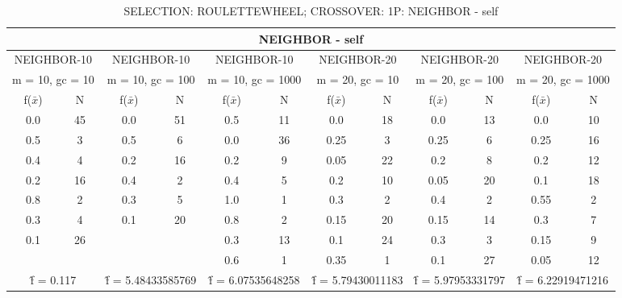 \begin{table}[H]
	\centering
	\caption{SELECTION: ROULETTEWHEEL; CROSSOVER: 1P: NEIGHBOR - self}
	\begin{adjustbox}{width=1\textwidth}
		\begin{tabular}{ |c|c||c|c||c|c||c|c||c|c||c|c| }
			\hline
			\multicolumn{12}{|c|}{NEIGHBOR - self} \\
			\hline
			\multicolumn{2}{|c||}{NEIGHBOR-10} & \multicolumn{2}{c||}{NEIGHBOR-10} & \multicolumn{2}{c||}{NEIGHBOR-10} & \multicolumn{2}{c||}{NEIGHBOR-20} & \multicolumn{2}{c||}{NEIGHBOR-20} & \multicolumn{2}{c|}{NEIGHBOR-20}\\
			\hline
			\multicolumn{2}{|c||}{m = 10, gc = 10} & \multicolumn{2}{c||}{m = 10, gc = 100} & \multicolumn{2}{c||}{m = 10, gc = 1000} & \multicolumn{2}{c||}{m = 20, gc = 10} & \multicolumn{2}{c||}{m = 20, gc = 100} & \multicolumn{2}{c|}{m = 20, gc = 1000}\\
			\hline
			f($\bar{x}$) & N & f($\bar{x}$) & N & f($\bar{x}$) & N & f($\bar{x}$) & N & f($\bar{x}$) & N & f($\bar{x}$) & N\\
			\hline
			\hline
			0.0 & 45 & 0.0 & 51 & 0.5 & 11 & 0.0 & 18 & 0.0 & 13 & 0.0 & 10\\
			0.5 & 3 & 0.5 & 6 & 0.0 & 36 & 0.25 & 3 & 0.25 & 6 & 0.25 & 16\\
			0.4 & 4 & 0.2 & 16 & 0.2 & 9 & 0.05 & 22 & 0.2 & 8 & 0.2 & 12\\
			0.2 & 16 & 0.4 & 2 & 0.4 & 5 & 0.2 & 10 & 0.05 & 20 & 0.1 & 18\\
			0.8 & 2 & 0.3 & 5 & 1.0 & 1 & 0.3 & 2 & 0.4 & 2 & 0.55 & 2\\
			0.3 & 4 & 0.1 & 20 & 0.8 & 2 & 0.15 & 20 & 0.15 & 14 & 0.3 & 7\\
			0.1 & 26 &   &   & 0.3 & 13 & 0.1 & 24 & 0.3 & 3 & 0.15 & 9\\
			&   &   &   & 0.6 & 1 & 0.35 & 1 & 0.1 & 27 & 0.05 & 12\\
			\hline
			\multicolumn{2}{|c||}{\^{f} = 0.117} & \multicolumn{2}{c||}{\^{f} = 5.48433585769} & \multicolumn{2}{c||}{\^{f} = 6.07535648258} & \multicolumn{2}{c||}{\^{f} = 5.79430011183} & \multicolumn{2}{c||}{\^{f} = 5.97953331797} & \multicolumn{2}{c|}{\^{f} = 6.22919471216}\\
			\hline
		\end{tabular}
	\end{adjustbox}
\end{table}
